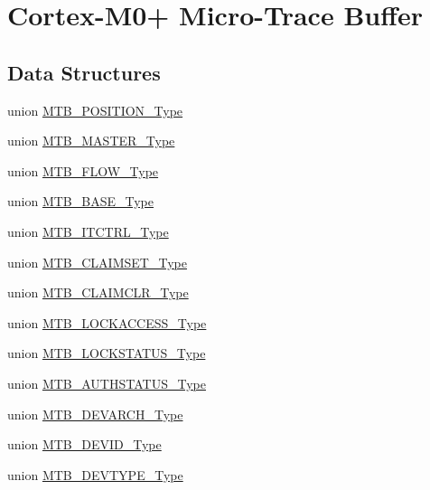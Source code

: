 \hypertarget{group___s_a_m_d21___m_t_b}{}\section{Cortex-\/\+M0+ Micro-\/\+Trace Buffer}
\label{group___s_a_m_d21___m_t_b}
\subsection*{Data Structures}
\begin{DoxyCompactItemize}
\item 
union \mbox{\hyperlink{union_m_t_b___p_o_s_i_t_i_o_n___type}{M\+T\+B\+\_\+\+P\+O\+S\+I\+T\+I\+O\+N\+\_\+\+Type}}
\item 
union \mbox{\hyperlink{union_m_t_b___m_a_s_t_e_r___type}{M\+T\+B\+\_\+\+M\+A\+S\+T\+E\+R\+\_\+\+Type}}
\item 
union \mbox{\hyperlink{union_m_t_b___f_l_o_w___type}{M\+T\+B\+\_\+\+F\+L\+O\+W\+\_\+\+Type}}
\item 
union \mbox{\hyperlink{union_m_t_b___b_a_s_e___type}{M\+T\+B\+\_\+\+B\+A\+S\+E\+\_\+\+Type}}
\item 
union \mbox{\hyperlink{union_m_t_b___i_t_c_t_r_l___type}{M\+T\+B\+\_\+\+I\+T\+C\+T\+R\+L\+\_\+\+Type}}
\item 
union \mbox{\hyperlink{union_m_t_b___c_l_a_i_m_s_e_t___type}{M\+T\+B\+\_\+\+C\+L\+A\+I\+M\+S\+E\+T\+\_\+\+Type}}
\item 
union \mbox{\hyperlink{union_m_t_b___c_l_a_i_m_c_l_r___type}{M\+T\+B\+\_\+\+C\+L\+A\+I\+M\+C\+L\+R\+\_\+\+Type}}
\item 
union \mbox{\hyperlink{union_m_t_b___l_o_c_k_a_c_c_e_s_s___type}{M\+T\+B\+\_\+\+L\+O\+C\+K\+A\+C\+C\+E\+S\+S\+\_\+\+Type}}
\item 
union \mbox{\hyperlink{union_m_t_b___l_o_c_k_s_t_a_t_u_s___type}{M\+T\+B\+\_\+\+L\+O\+C\+K\+S\+T\+A\+T\+U\+S\+\_\+\+Type}}
\item 
union \mbox{\hyperlink{union_m_t_b___a_u_t_h_s_t_a_t_u_s___type}{M\+T\+B\+\_\+\+A\+U\+T\+H\+S\+T\+A\+T\+U\+S\+\_\+\+Type}}
\item 
union \mbox{\hyperlink{union_m_t_b___d_e_v_a_r_c_h___type}{M\+T\+B\+\_\+\+D\+E\+V\+A\+R\+C\+H\+\_\+\+Type}}
\item 
union \mbox{\hyperlink{union_m_t_b___d_e_v_i_d___type}{M\+T\+B\+\_\+\+D\+E\+V\+I\+D\+\_\+\+Type}}
\item 
union \mbox{\hyperlink{union_m_t_b___d_e_v_t_y_p_e___type}{M\+T\+B\+\_\+\+D\+E\+V\+T\+Y\+P\+E\+\_\+\+Type}}

\end{DoxyCompactItemize}

